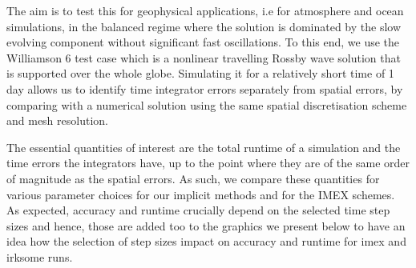 \documentclass[a4paper, 12pt]{article}
\begin{document}
The aim is to test this for geophysical applications, i.e for
atmosphere and ocean simulations, in the balanced regime where the
solution is dominated by the slow evolving component without
significant fast oscillations. To this end, we use the Williamson 6
test case which is a nonlinear travelling Rossby wave solution that is
supported over the whole globe. Simulating it for a relatively short
time of 1 day allows us to identify time integrator errors separately
from spatial errors, by comparing with a numerical solution using the
same spatial discretisation scheme and mesh resolution. 

The essential quantities of interest are the total runtime of a
simulation and the time errors the integrators have, up to
the point where they are of the same order of magnitude as the spatial
errors. As such, we compare these quantities for various
parameter choices for our implicit methods and for the IMEX
schemes. As expected, accuracy and runtime crucially depend on the
selected time step sizes and hence, those are added too to the
graphics we present below to have an idea how the selection of step
sizes impact on accuracy and runtime for imex and irksome runs.
\end{document}
